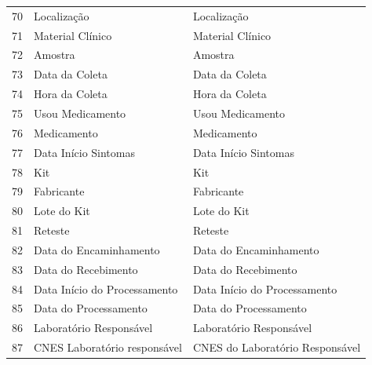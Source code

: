 \begin{table}
\begin{tabular}{lll}
70                                   & Localização                      & Localização                       \\
71                                   & Material Clínico                 & Material Clínico                  \\
72                                   & Amostra                          & Amostra                           \\
\rowcolor[rgb]{0.753,0.753,0.753} 73 & Data da Coleta                   & Data da Coleta                    \\
74                                   & Hora da Coleta                   & Hora da Coleta                    \\
75                                   & Usou Medicamento                 & Usou Medicamento                  \\
76                                   & Medicamento                      & Medicamento                       \\
77                                   & Data Início Sintomas             & Data Início Sintomas              \\
78                                   & Kit                              & Kit                               \\
79                                   & Fabricante                       & Fabricante                        \\
80                                   & Lote do Kit                      & Lote do Kit                       \\
81                                   & Reteste                          & Reteste                           \\
82                                   & Data do Encaminhamento           & Data do Encaminhamento            \\
83                                   & Data do Recebimento              & Data do Recebimento               \\
84                                   & Data Início do Processamento     & Data Início do Processamento      \\
85                                   & Data do Processamento            & Data do Processamento             \\
86                                   & Laboratório Responsável          & Laboratório Responsável           \\
87                                   & CNES Laboratório responsável     & CNES do Laboratório Responsável   \\

\end{tabular}
\end{table}
